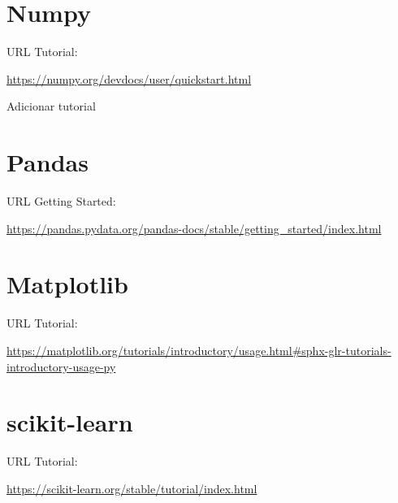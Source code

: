 \documentclass{article}
\begin{document}
\section{Numpy}

URL Tutorial:

\url{https://numpy.org/devdocs/user/quickstart.html}

Adicionar tutorial

\section{Pandas}
URL Getting Started:

\url{https://pandas.pydata.org/pandas-docs/stable/getting_started/index.html}

\section{Matplotlib}
URL Tutorial:

\url{https://matplotlib.org/tutorials/introductory/usage.html#sphx-glr-tutorials-introductory-usage-py}

\section{scikit-learn}
URL Tutorial:

\url{https://scikit-learn.org/stable/tutorial/index.html}
    
\end{document}
